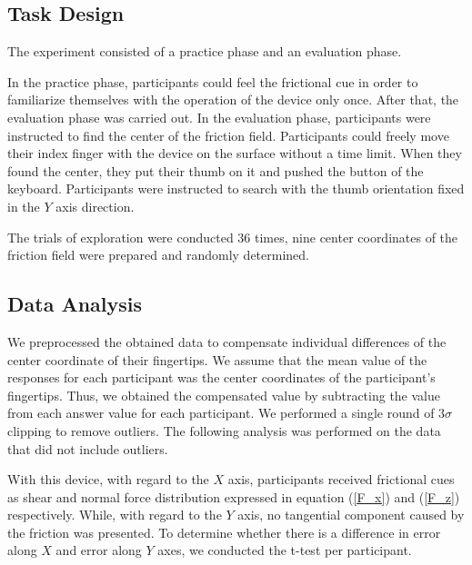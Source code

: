\subsection{Task Design}

The experiment consisted of a practice phase and an evaluation phase. 

In the practice phase, participants could feel the frictional cue in order to familiarize themselves with the operation of the device only once.
After that, the evaluation phase was carried out.
In the evaluation phase, participants were instructed to find the center of the friction field.
Participants could freely move their index finger with the device on the surface without a time limit.
When they found the center, they put their thumb on it and pushed the button of the keyboard.
Participants were instructed to search with the thumb orientation fixed in the $Y$ axis direction.

The trials of exploration were conducted 36 times, nine center coordinates of the friction field were prepared and randomly determined.

\subsection{Data Analysis}

We preprocessed the obtained data to compensate individual differences of the center coordinate of their fingertips.
We assume that the mean value of the responses for each participant was the center coordinates of the participant’s fingertips.
Thus, we obtained the compensated value by subtracting the value from each answer value for each participant. 
We performed a single round of 3$\sigma$ clipping to remove
outliers. 
The following analysis was performed on the data that did not include outliers.

With this device, with regard to the $X$ axis, participants received frictional cues as shear and normal force distribution expressed in equation (\ref{F_x}) and (\ref{F_z}) respectively.
While, with regard to the $Y$ axis, no tangential component caused by the friction was presented.
To determine whether there is a difference in error along $X$ and error along $Y$ axes, we conducted the t-test per participant.

